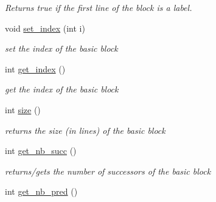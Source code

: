 \begin{DoxyCompactItemize}
\begin{DoxyCompactList}\small\item\em Returns true if the first line of the block is a label. \end{DoxyCompactList}\item 
\hypertarget{class_basic__block_a5bdba6b1e3307dc03c38b8249c4b3fa8}{}void \hyperlink{class_basic__block_a5bdba6b1e3307dc03c38b8249c4b3fa8}{set\+\_\+index} (int i)\label{class_basic__block_a5bdba6b1e3307dc03c38b8249c4b3fa8}

\begin{DoxyCompactList}\small\item\em set the index of the basic block \end{DoxyCompactList}\item 
\hypertarget{class_basic__block_a8cb196904537be8fb0474afce7c769c1}{}int \hyperlink{class_basic__block_a8cb196904537be8fb0474afce7c769c1}{get\+\_\+index} ()\label{class_basic__block_a8cb196904537be8fb0474afce7c769c1}

\begin{DoxyCompactList}\small\item\em get the index of the basic block \end{DoxyCompactList}\item 
\hypertarget{class_basic__block_a5574d52e3ecdbf36e52c42c31bfc73db}{}int \hyperlink{class_basic__block_a5574d52e3ecdbf36e52c42c31bfc73db}{size} ()\label{class_basic__block_a5574d52e3ecdbf36e52c42c31bfc73db}

\begin{DoxyCompactList}\small\item\em returns the size (in lines) of the basic block \end{DoxyCompactList}\item 
\hypertarget{class_basic__block_a3ccc47a22b9d5d9e932862ab37783225}{}int \hyperlink{class_basic__block_a3ccc47a22b9d5d9e932862ab37783225}{get\+\_\+nb\+\_\+succ} ()\label{class_basic__block_a3ccc47a22b9d5d9e932862ab37783225}

\begin{DoxyCompactList}\small\item\em returns/gets the number of successors of the basic block \end{DoxyCompactList}\item 
\hypertarget{class_basic__block_ade6f71459e5b54108022a16a4a6a00cb}{}int \hyperlink{class_basic__block_ade6f71459e5b54108022a16a4a6a00cb}{get\+\_\+nb\+\_\+pred} ()\label{class_basic__block_ade6f71459e5b54108022a16a4a6a00cb}


\end{DoxyCompactItemize}
